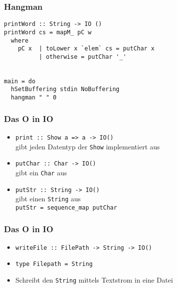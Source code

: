 \begin{frame}[fragile]
\frametitle{Hangman}
\begin{lstlisting}
printWord :: String -> IO ()
printWord cs = mapM_ pC w 
  where
    pC x  | toLower x `elem` cs = putChar x
          | otherwise = putChar '_'

          
main = do
  hSetBuffering stdin NoBuffering
  hangman " " 0
\end{lstlisting}	
\end{frame}

\begin{frame}
\frametitle{Das O in IO}
\begin{block}{\vspace*{-3ex}}
\begin{itemize}
  \item \lstinline|print :: Show a => a -> IO()| \\ gibt jeden Datentyp der \lstinline|Show| implementiert aus
  \item \lstinline|putChar :: Char -> IO()| \\ gibt ein \lstinline|Char| aus
  \item \lstinline|putStr :: String -> IO()|\\ gibt einen \lstinline|String| aus \\
  \lstinline|putStr = sequence_map putChar|
\end{itemize}
\end{block}
\end{frame}

\begin{frame}
\frametitle{Das O in IO}
\begin{block}{\vspace*{-3ex}}
\begin{itemize}
  \item \lstinline|writeFile :: FilePath -> String -> IO()| 
  \item \lstinline|type Filepath = String|
  \item Schreibt den \lstinline|String| mittels Textstrom in eine Datei
\end{itemize}
\end{block}
\end{frame}

